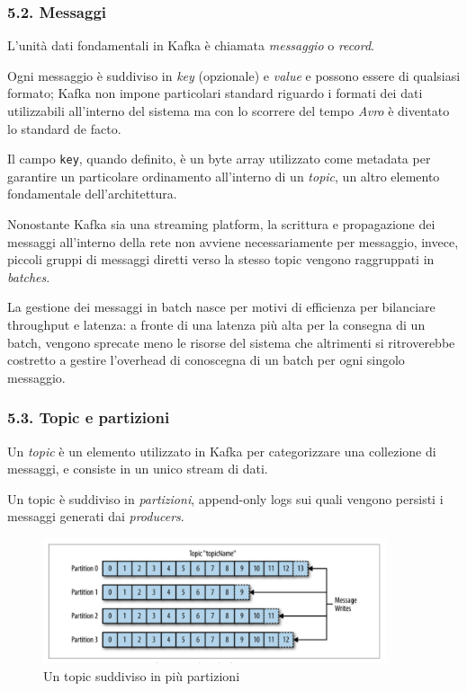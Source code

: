 \documentclass[]{article}
\begin{document}
\subsubsection{5.2. Messaggi}\label{messaggi}

L'unità dati fondamentali in Kafka è chiamata \emph{messaggio} o
\emph{record}.

Ogni messaggio è suddiviso in \emph{key} (opzionale) e \emph{value} e
possono essere di qualsiasi formato; Kafka non impone particolari
standard riguardo i formati dei dati utilizzabili all'interno del
sistema ma con lo scorrere del tempo \emph{Avro} è diventato lo standard
de facto.

Il campo \texttt{key}, quando definito, è un byte array utilizzato come
metadata per garantire un particolare ordinamento all'interno di un
\emph{topic}, un altro elemento fondamentale dell'architettura.

Nonostante Kafka sia una streaming platform, la scrittura e propagazione
dei messaggi all'interno della rete non avviene necessariamente per
messaggio, invece, piccoli gruppi di messaggi diretti verso la stesso
topic vengono raggruppati in \emph{batches}.

La gestione dei messaggi in batch nasce per motivi di efficienza per
bilanciare throughput e latenza: a fronte di una latenza più alta per la
consegna di un batch, vengono sprecate meno le risorse del sistema che
altrimenti si ritroverebbe costretto a gestire l'overhead di conoscegna
di un batch per ogni singolo messaggio.

\newpage

\subsubsection{5.3. Topic e partizioni}\label{topic-e-partizioni}

Un \emph{topic} è un elemento utilizzato in Kafka per categorizzare una
collezione di messaggi, e consiste in un unico stream di dati.

Un topic è suddiviso in \emph{partizioni}, append-only logs sui quali
vengono persisti i messaggi generati dai \emph{producers}.

\begin{figure}
\centering
\includegraphics[width=0.90000\textwidth]{../images/topic-and-partitions.png}
\caption{Un topic suddiviso in più partizioni \label{figure_3}}
\end{figure}
\end{document}
